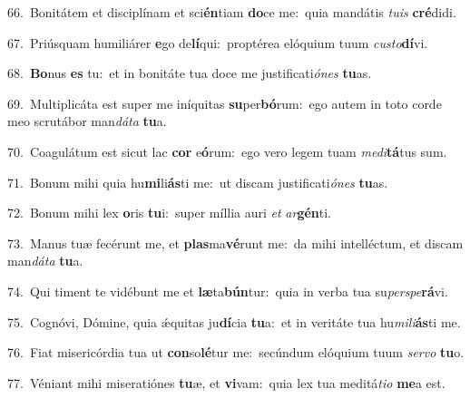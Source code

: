 {\numbfont\textcolor{\numbcolor}{66.}}~Bonitátem et disciplínam et sci\-\textbf{én}\-tiam \textbf{do}\-ce me:~\star quia mandátis \textit{tu}\-\textit{is} \textbf{cré}\-didi.\par
{\numbfont\textcolor{\numbcolor}{67.}}~Priúsquam humiliárer \textbf{e}\-go de\-\textbf{lí}\-qui:~\star proptérea elóquium tuum \textit{cus}\-\textit{to}\textbf{dí}vi.\par
{\numbfont\textcolor{\numbcolor}{68.}}~\-\textbf{Bo}\-nus \textbf{es} tu:~\star et in bonitáte tua doce me justificati\-\textit{ó}\-\textit{nes} \textbf{tu}\-as.\par
{\numbfont\textcolor{\numbcolor}{69.}}~Multiplicáta est super me iníquitas \textbf{su}\-per\-\textbf{bó}\-rum:~\star ego autem in toto corde meo scrutábor man\-\textit{dá}\-\textit{ta} \textbf{tu}\-a.\par
{\numbfont\textcolor{\numbcolor}{70.}}~Coagulátum est sicut lac \textbf{cor} e\-\textbf{ó}\-rum:~\star ego vero legem tuam \textit{me}\-\textit{di}\textbf{tá}tus sum.\par
{\numbfont\textcolor{\numbcolor}{71.}}~Bonum mihi quia hu\-\textbf{mi}\-li\-\textbf{ás}\-ti me:~\star ut discam justificati\-\textit{ó}\-\textit{nes} \textbf{tu}\-as.\par
{\numbfont\textcolor{\numbcolor}{72.}}~Bonum mihi lex \textbf{o}\-ris \textbf{tu}\-i:~\star super míllia auri \textit{et} \textit{ar}\-\textbf{gén}ti.\par
{\numbfont\textcolor{\numbcolor}{73.}}~Manus tuæ fecérunt me, et \textbf{plas}\-ma\-\textbf{vé}\-runt me:~\star da mihi intelléctum, et discam man\-\textit{dá}\-\textit{ta} \textbf{tu}\-a.\par
{\numbfont\textcolor{\numbcolor}{74.}}~Qui timent te vidébunt me et \textbf{læ}\-ta\-\textbf{bún}\-tur:~\star quia in verba tua su\-\textit{per}\-\textit{spe}\textbf{rá}vi.\par
{\numbfont\textcolor{\numbcolor}{75.}}~Cognóvi, Dómine, quia ǽquitas ju\-\textbf{dí}\-cia \textbf{tu}\-a:~\star et in veritáte tua hu\-\textit{mi}\-\textit{li}\textbf{ás}ti me.\par
{\numbfont\textcolor{\numbcolor}{76.}}~Fiat misericórdia tua ut \textbf{con}\-so\-\textbf{lé}\-tur me:~\star secúndum elóquium tuum \textit{ser}\-\textit{vo} \textbf{tu}\-o.\par
{\numbfont\textcolor{\numbcolor}{77.}}~Véniant mihi miseratiónes \textbf{tu}\-æ, et \textbf{vi}\-vam:~\star quia lex tua meditá\-\textit{ti}\-\textit{o} \textbf{me}\-a est.\par
